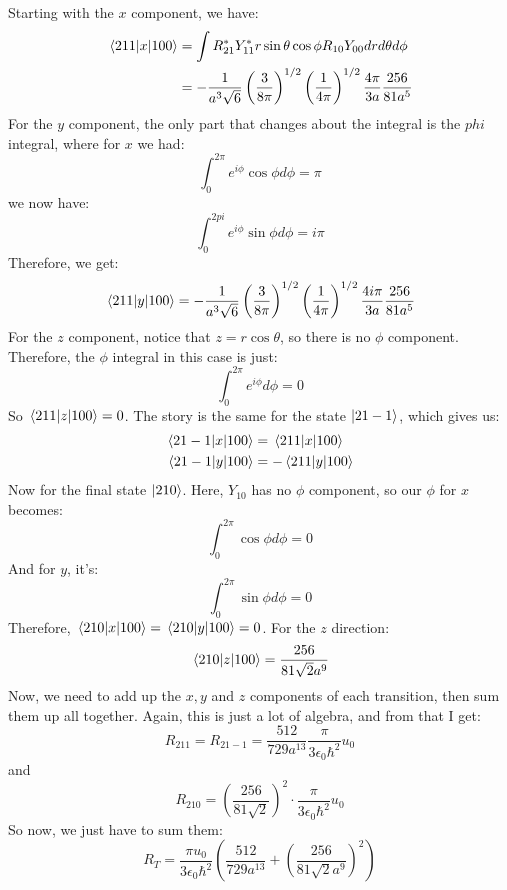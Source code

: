 \documentclass[10pt]{article}
\begin{document}
\begin{solution}
		Starting with the $x$ component, we have:
		\begin{align*}
			\mel{211}{x}{100} &= \int R_{21}^* Y_{11}^* r \sin \theta \cos \phi R_{10} Y_{00} dr d\theta d\phi\\
			&= -\frac{1}{a^3 \sqrt 6} \left( \frac{3}{8\pi}\right)^{1/2} \left( \frac{1}{4\pi}\right)^{1/2} \frac{4\pi}{3a} \frac{256}{81a^5}
		\end{align*}
		For the $y$ component, the only part that changes about the integral is the $phi$ integral, where for $x$ we had: 
		\[ \int_0^{2\pi} e^{i\phi}\cos \phi d\phi = \pi \]
		we now have: 
		\[ \int_0^{2pi} e^{i\phi} \sin \phi d\phi = i\pi\]
		Therefore, we get: 
		\[ \mel{211}{y}{100} = -\frac{1}{a^3 \sqrt 6} \left( \frac{3}{8\pi}\right)^{1/2} \left( \frac{1}{4\pi}\right)^{1/2} \frac{4i\pi}{3a} \frac{256}{81a^5}\]
		For the $z$ component, notice that $z = r\cos \theta$, so there is no $\phi$ component. Therefore, the $\phi$ integral in this case is just: 
		\[ \int_0^{2\pi} e^{i\phi} d\phi = 0\] 
		So $\mel{211}{z}{100} = 0$. The story is the same for the state $\ket{21-1}$, which gives us: 
		\begin{align*}
			\mel{21-1}{x}{100} &= \mel{211}{x}{100}\\
			\mel{21-1}{y}{100} &= -\mel{211}{y}{100}
		\end{align*}
		Now for the final state $\ket{210}$. Here, $Y_{10}$ has no $\phi$ component, so our $\phi$ for $x$ becomes: 
		\[ \int_0^{2\pi} \cos \phi d\phi = 0\] 
		And for $y$, it's: 
		\[ \int_0^{2\pi} \sin \phi d\phi = 0\] 
		Therefore, $\mel{210}{x}{100} = \mel{210}{y}{100} = 0$. For the $z$ direction:
		\[ \mel{210}{z}{100} = \frac{256}{81 \sqrt 2 a^9}\]
		Now, we need to add up the $x, y$ and $z$ components of each transition, then sum them up all together. Again, this is just a lot of algebra, and from that I get:
		\[ R_{211} = R_{21-1} = \frac{512}{729 a^{13}} \frac{\pi}{3\epsilon_0 \hbar^2} u_0\]
		and 
		\[ R_{210} = \left( \frac{256}{81 \sqrt 2}\right)^2 \cdot \frac{\pi}{3\epsilon_0 \hbar^2} u_0\]
		So now, we just have to sum them:
		\[ R_T = \frac{\pi u_0}{3\epsilon_0 \hbar^2} \left( \frac{512}{729a^{13}} + \left( \frac{256}{81 \sqrt{2}a^9}\right)^2\right)\]
	\end{solution}
\end{document}
